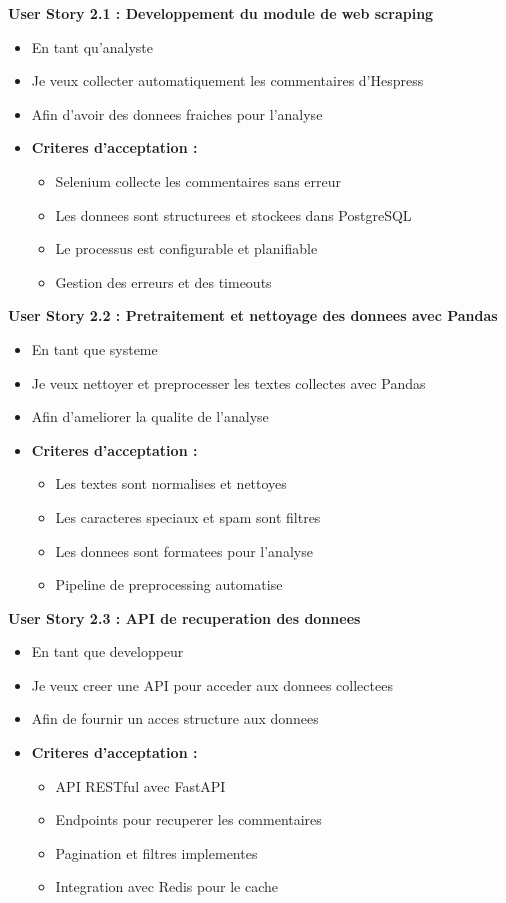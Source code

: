 \textbf{User Story 2.1 : Developpement du module de web scraping}
\begin{itemize}
    \item En tant qu'analyste
    \item Je veux collecter automatiquement les commentaires d'Hespress
    \item Afin d'avoir des donnees fraiches pour l'analyse
    \item \textbf{Criteres d'acceptation :}
    \begin{itemize}
        \item Selenium collecte les commentaires sans erreur
        \item Les donnees sont structurees et stockees dans PostgreSQL
        \item Le processus est configurable et planifiable
        \item Gestion des erreurs et des timeouts
    \end{itemize}
\end{itemize}

\textbf{User Story 2.2 : Pretraitement et nettoyage des donnees avec Pandas}
\begin{itemize}
    \item En tant que systeme
    \item Je veux nettoyer et preprocesser les textes collectes avec Pandas
    \item Afin d'ameliorer la qualite de l'analyse
    \item \textbf{Criteres d'acceptation :}
    \begin{itemize}
        \item Les textes sont normalises et nettoyes
        \item Les caracteres speciaux et spam sont filtres
        \item Les donnees sont formatees pour l'analyse
        \item Pipeline de preprocessing automatise
    \end{itemize}
\end{itemize}

\textbf{User Story 2.3 : API de recuperation des donnees}
\begin{itemize}
    \item En tant que developpeur
    \item Je veux creer une API pour acceder aux donnees collectees
    \item Afin de fournir un acces structure aux donnees
    \item \textbf{Criteres d'acceptation :}
    \begin{itemize}
        \item API RESTful avec FastAPI
        \item Endpoints pour recuperer les commentaires
        \item Pagination et filtres implementes
        \item Integration avec Redis pour le cache
    \end{itemize}
\end{itemize}

